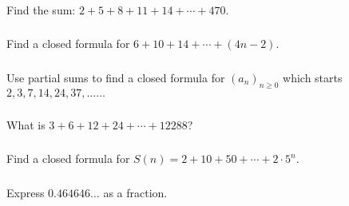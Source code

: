 \documentclass[11pt, compress]{beamer}
\begin{document}
\begin{frame}
\frametitle{}
\begin{example}[2.2.4]Find the sum: \(2 + 5 + 8 + 11 + 14 + \cdots + 470\).
\end{example}
\end{frame}
 
\begin{frame}
\frametitle{}
\begin{example}[2.2.5]Find a closed formula for \(6 + 10 + 14 + \cdots + (4n - 2)\).
\end{example}
\end{frame}
 
\begin{frame}
\frametitle{}
\begin{example}[2.2.6]Use partial sums to find a closed formula for \((a_n)_{n\ge 0}\) which starts \(2, 3, 7, 14, 24, 37,\ldots \ldots\)
\end{example}
\end{frame}
 
\begin{frame}
\frametitle{}
\begin{example}[2.2.7]What is \(3 + 6 + 12 + 24 + \cdots + 12288\)?
\end{example}
\end{frame}
 
\begin{frame}
\frametitle{}
\begin{example}[2.2.8]Find a closed formula for \(S(n) = 2 + 10 + 50 + \cdots + 2\cdot 5^n\).
\end{example}
\end{frame}
 
\begin{frame}
\frametitle{}
\begin{example}[2.2.9]Express \(0.464646\ldots\) as a fraction.
\end{example}
\end{frame}
 
\end{document}

